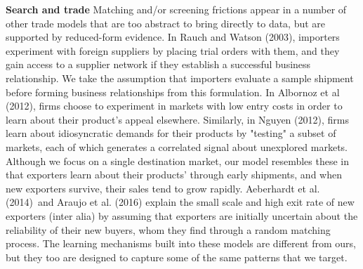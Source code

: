 \documentclass[12pt]{article}
\begin{document}
\textbf{Search and trade} Matching and/or screening frictions appear in a
number of other trade models that are too abstract to bring directly to
data, but are supported by reduced-form evidence. In Rauch and Watson
(2003), importers experiment with foreign suppliers by placing trial orders
with them, and they gain access to a supplier network if they establish a
successful business relationship. We take the assumption that importers
evaluate a sample shipment before forming business relationships from this
formulation. In Albornoz et al (2012), firms choose to experiment in markets
with low entry costs in order to learn about their product's appeal
elsewhere. Similarly, in Nguyen (2012), firms learn about idiosyncratic
demands for their products by "testing" a subset of markets, each of which
generates a correlated signal about unexplored markets. Although we focus on
a single destination market, our model resembles these in that exporters
learn about their products' through early shipments, and when new exporters
survive, their sales tend to grow rapidly. Aeberhardt et al. (2014)\ and
Araujo et al. (2016) explain the small scale and high exit rate of new
exporters (inter alia) by assuming that exporters are initially uncertain
about the reliability of their new buyers, whom they find through a random
matching process. The learning mechanisms built into these models are
different from ours, but they too are designed to capture some of the same
patterns that we target. 
\end{document}
